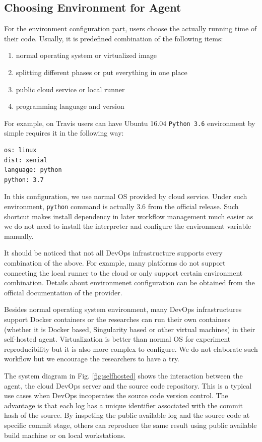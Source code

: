 \documentclass{IEEEcsmag}
\begin{document}
\subsection{Choosing Environment for Agent}
For the environment configuration part, users choose the actually running time of their code. Usually, it is predefined combination of the following items:
\begin{enumerate}
\item normal operating system or virtualized image
\item splitting different phases or put everything in one place
\item public cloud service or local runner
\item programming language and version
\end{enumerate}

For example, on Travis users can have Ubuntu 16.04 \texttt{Python 3.6} environment by simple requires it in the following way:
\begin{lstlisting}[caption={environment configuration}]
os: linux
dist: xenial
language: python
python: 3.7
\end{lstlisting}

In this configuration, we use normal OS provided by cloud service. Under such environment, \texttt{python} command is actually 3.6 from the official release.
Such shortcut makes install dependency in later workflow management much easier as we do not need to install the interpreter and configure the environment variable manually.

It should be noticed that not all DevOps infrastructure supports every combination of the above. For example, many platforms do not support connecting the local runner to the cloud or only support certain environment combination. Details about environmenet configuration can be obtained from the official documentation of the provider.

Besides normal operating system environment, many DevOps infrastructures support Docker containers or the researches can run their own containers (whether it is Docker based, Singularity based or other virtual machines) in their self-hosted agent. Virtualization is better than normal OS for experiment reproducibility but it is also more complex to configure. We do not elaborate such workflow but we encourage the researchers to have a try.

The system diagram in Fig. \ref{fig:selfhosted} shows the interaction between the agent, the cloud DevOps server and the source code repository. 
This is a typical use cases when DevOps incoperates the source code version control. The advantage is that each log has a unique identifier associated with the commit hash of the source. By inspeting the public available log and the source code at specific commit stage, others can reproduce the same result using public available build machine or on local workstations.
\end{document}
